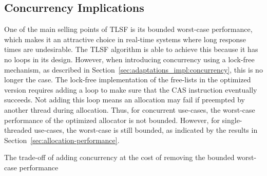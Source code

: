
\subsection{Concurrency Implications}

One of the main selling points of TLSF is its bounded worst-case performance, which makes it an attractive choice in real-time systems where long response times are undesirable. The TLSF algorithm is able to achieve this because it has no loops in its design. However, when introducing concurrency using a lock-free mechanism, as described in Section~\ref{sec:adaptations_impl:concurrency}, this is no longer the case. The lock-free implementation of the free-lists in the optimized version requires adding a loop to make sure that the CAS instruction eventually succeeds. Not adding this loop means an allocation may fail if preempted by another thread during allocation. Thus, for concurrent use-cases, the worst-case performance of the optimized allocator is not bounded. However, for single-threaded use-cases, the worst-case is still bounded, as indicated by the results in Section~\ref{sec:allocation-performance}.

The trade-off of adding concurrency at the cost of removing the bounded worst-case performance 

